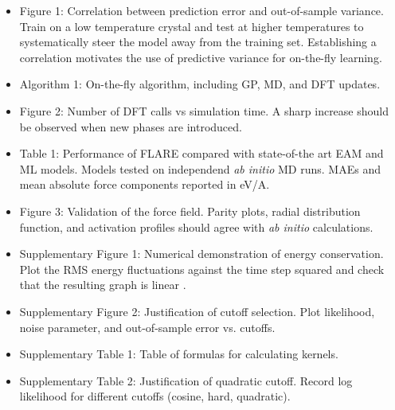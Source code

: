 \documentclass[%
superscriptaddress,
preprint,
amsmath,amssymb,
aps,
prl,
]{revtex4-1}
\begin{document}
\begin{itemize}

\item Figure 1: Correlation between prediction error and out-of-sample variance. Train on a low temperature crystal and test at higher temperatures to systematically steer the model away from the training set. Establishing a correlation motivates the use of predictive variance for on-the-fly learning.

\item Algorithm 1: On-the-fly algorithm, including GP, MD, and DFT updates.

\item Figure 2: Number of DFT calls vs simulation time. A sharp increase should be observed when new phases are introduced.

\item Table 1: Performance of FLARE compared with state-of-the art EAM and ML models. Models tested on independend \textit{ab initio} MD runs. MAEs and mean absolute force components reported in eV/A.

\item Figure 3: Validation of the force field. Parity plots, radial distribution function, and activation profiles should agree with \textit{ab initio} calculations.

\item Supplementary Figure 1: Numerical demonstration of energy conservation. Plot the RMS energy fluctuations against the time step squared and check that the resulting graph is linear \cite{allen2017computer}.

\item Supplementary Figure 2: Justification of cutoff selection. Plot likelihood, noise parameter, and out-of-sample error vs. cutoffs.

\item Supplementary Table 1: Table of formulas for calculating kernels.

\item Supplementary Table 2: Justification of quadratic cutoff. Record log likelihood for different cutoffs (cosine, hard, quadratic).

\end{itemize}
\end{document}
